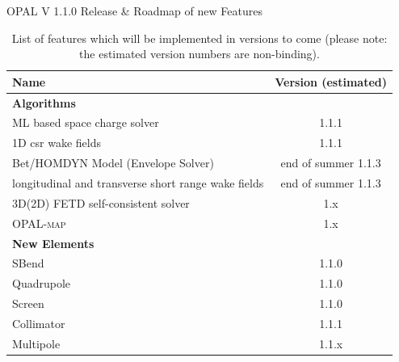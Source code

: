 \documentclass[xcolor=pdftex,table,10pt,yellow,mathserif]{beamer}
\newcommand{\opal}{\textsc{OPAL }}
\newcommand{\opalmap}{\textsc{OPAL-map }}
\begin{document}
\begin{frame}{\opal V 1.1.0 Release \& Roadmap of new Features}

\begin{block}{}
\begin{table}[ht]\footnotesize
\begin{center}
\begin{tabular}{p{7cm}c}
\hline
{\bf Name} & {\bf Version (estimated)} \\
\hline
{\bf Algorithms} & \\
ML based space charge solver & 1.1.1 \\
1D csr wake fields & 1.1.1 \\
Bet/HOMDYN Model (Envelope Solver) & end of summer 1.1.3\\
longitudinal and transverse short range wake fields& end of summer 1.1.3 \\
3D(2D) FETD self-consistent solver & 1.x \\
\opalmap & 1.x \\
\hline
{\bf New Elements} &  \\
SBend & 1.1.0 \\
Quadrupole & 1.1.0 \\
Screen & 1.1.0 \\
Collimator & 1.1.1 \\
Multipole & 1.1.x \\
\hline
\end{tabular}
\caption{List of features which will be implemented in versions to come (please note: the estimated version numbers are non-binding).}
\label{roadmap}
\end{center}
\end{table}
\end{block}
\end{frame}
\end{document}
